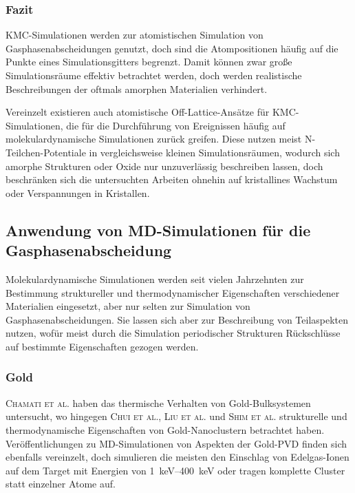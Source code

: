 \subsubsection{Fazit}

KMC-Simulationen werden zur atomistischen Simulation von Gasphasenabscheidungen genutzt, doch sind die Atompositionen häufig auf die Punkte eines Simulationsgitters begrenzt.
Damit können zwar große Simulationsräume effektiv betrachtet werden, doch werden realistische Beschreibungen der oftmals amorphen Materialien verhindert.

Vereinzelt existieren auch atomistische Off-Lattice-Ansätze für KMC-Simulationen, die für die Durchführung von Ereignissen häufig auf molekulardynamische Simulationen zurück greifen.
Diese nutzen meist N-Teilchen-Potentiale in vergleichsweise kleinen Simulationsräumen, wodurch sich amorphe Strukturen oder Oxide nur unzuverlässig beschreiben lassen, doch beschränken sich die untersuchten Arbeiten ohnehin auf kristallines Wachstum oder Verspannungen in Kristallen.

\subsection{Anwendung von MD-Simulationen für die Gasphasenabscheidung}

Molekulardynamische Simulationen werden seit vielen Jahrzehnten zur Bestimmung struktureller und thermodynamischer Eigenschaften verschiedener Materialien eingesetzt, aber nur selten zur Simulation von Gasphasenabscheidungen.
Sie lassen sich aber zur Beschreibung von Teilaspekten nutzen, wofür meist durch die Simulation periodischer Strukturen Rückschlüsse auf bestimmte Eigenschaften gezogen werden.

\subsubsection{Gold}
\textsc{Chamati et al.}\cite{chamati_second-moment_2004} haben das thermische Verhalten von Gold-Bulksystemen untersucht, wo hingegen \textsc{Chui et al.}\cite{chui_molecular_2007}, \textsc{Liu et al.}\cite{liu_melting_2001} und \textsc{Shim et al.}\cite{shim_molecular_2003} strukturelle und thermodynamische Eigenschaften von Gold-Nanoclustern betrachtet haben.
Veröffentlichungen zu MD-Simulationen von Aspekten der Gold-PVD finden sich ebenfalls vereinzelt, doch simulieren die meisten den Einschlag von Edelgas-Ionen auf dem Target mit Energien von \SIrange{1}{400}{\kilo\electronvolt}\cite{insepov_molecular_1995,shapiro_simulation_1999} oder tragen komplette Cluster statt einzelner Atome auf\cite{inoue_molecular_2008}.

